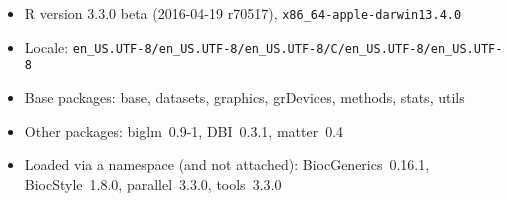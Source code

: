 \documentclass[a4paper]{article}
\begin{document}
\begin{itemize}\raggedright
  \item R version 3.3.0 beta (2016-04-19 r70517), \verb|x86_64-apple-darwin13.4.0|
  \item Locale: \verb|en_US.UTF-8/en_US.UTF-8/en_US.UTF-8/C/en_US.UTF-8/en_US.UTF-8|
  \item Base packages: base, datasets, graphics, grDevices, methods, stats, utils
  \item Other packages: biglm~0.9-1, DBI~0.3.1, matter~0.4
  \item Loaded via a namespace (and not attached): BiocGenerics~0.16.1, BiocStyle~1.8.0,
    parallel~3.3.0, tools~3.3.0
\end{itemize}
% 
% 
\end{document}

